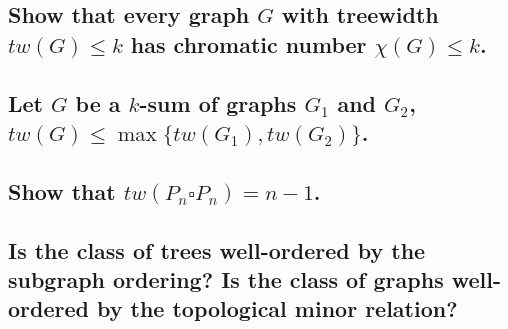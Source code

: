 \subsection[Minors 2 - 1]{Show that every graph $G$ with treewidth $tw(G) \leq k$ has chromatic number $\chi(G) \leq k$.}

\subsection[Minors 2 - 3]{Let $G$ be a $k$-sum of graphs $G_1$ and $G_2$, $tw(G) \leq \max\{tw(G_1), tw(G_2)\}$.}

\subsection[Minors 2 - 5]{Show that $tw(P_n \square P_n) = n-1$.}

\subsection[Minors 2 - 7]{Is the class of trees well-ordered by the subgraph ordering? Is the class of graphs well-ordered by the topological minor relation?}
